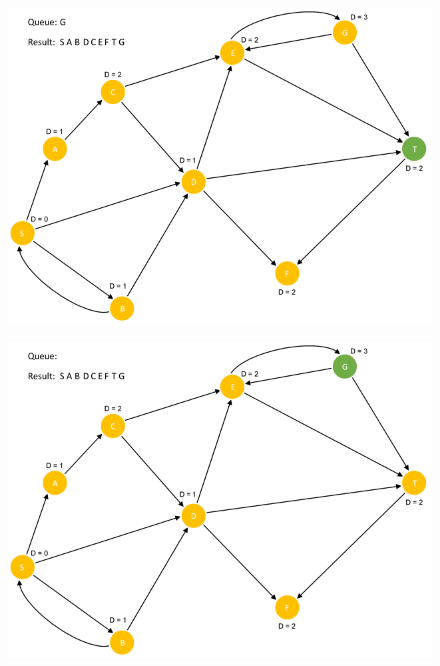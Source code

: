\documentclass{article}
\begin{document}
\begin{figure}[H]
\centering
\includegraphics[scale=0.6]{images/Q4/16.png}
\end{figure}

\begin{figure}[H]
\centering
\includegraphics[scale=0.6]{images/Q4/17.png}
\end{figure}
\end{document}
